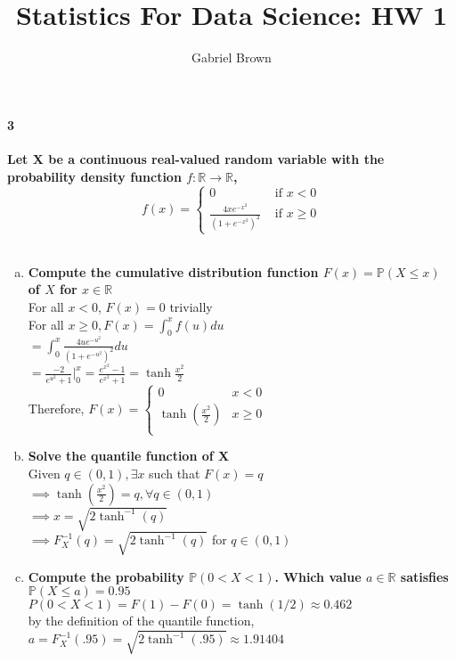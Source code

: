 \documentclass[10pt,letterpaper]{article}
\author{Gabriel Brown}
\title{Statistics For Data Science: HW 1}
\begin{document}
\paragraph{3}
\textbf{Let X be a continuous real-valued random variable with the probability density
function $f: \mathbb{R} \xrightarrow{} \mathbb{R}$,
$$f(x) = \begin{cases}
    0 & \text{ if } x < 0\\
    \frac{4xe^{-x^2}}{(1+e^{-x^2})^2} & \text{ if } x \geq 0
\end{cases}$$}\\
\begin{enumerate}[(a)]
    \item \textbf{Compute the cumulative distribution function $F(x) = \mathbb{P}(X \leq x)$ of $X$ for $x \in \mathbb{R}$}\\
    For all $x < 0$, $F(x) = 0$ trivially\\
    For all $x \geq 0, F(x) = \int_{0}^{x} f(u) du$\\
    $= \int_{0}^{x} \frac{4ue^{-u^2}}{(1+e^{-u^2})^2} du$\\
    $= \frac{-2}{e^{u^2}+1}|_{0}^{x} = \frac{e^{x^2}-1}{e^{x^2}+1} = \tanh{\frac{x^2}{2}}$\\
    Therefore,
    $F(x) = \begin{cases}
        0 & x < 0\\
        \tanh(\frac{x^2}{2}) & x \geq 0\\
    \end{cases}$

    \item \textbf{Solve the quantile function of X}\\
    Given $q \in (0,1), \exists x$ such that $F(x) = q$\\
    $\implies \tanh(\frac{x^2}{2}) = q, \forall q\in (0,1)$\\
    $\implies x = \sqrt{2\tanh^{-1}(q)}$\\
    $\implies F_X^{-1}(q)= \sqrt{2\tanh^{-1}(q)}$ for $q\in (0,1)$

    \item \textbf{Compute the probability $\mathbb{P}(0 < X < 1)$. Which value $a\in \mathbb{R}$ satisfies $\mathbb{P}(X \leq a) = 0.95$}\\
    $P(0 < X < 1) = F(1) - F(0) = \tanh(1/2) \approx 0.462$\\
    by the definition of the quantile function, $a = F_X^{-1}(.95) = \sqrt{2\tanh^{-1}(.95)} \approx 1.91404$
\end{enumerate}
\end{document}
